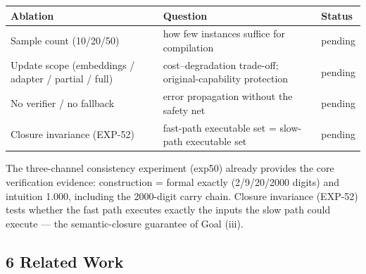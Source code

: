 \documentclass[
]{article}
\begin{document}
\begin{longtable}[]{@{}
  >{\raggedright\arraybackslash}p{}
  >{\raggedright\arraybackslash}p{}
  >{\raggedright\arraybackslash}p{}@{}}
\toprule\noalign{}
\begin{minipage}[b]{\linewidth}\raggedright
Ablation
\end{minipage} & \begin{minipage}[b]{\linewidth}\raggedright
Question
\end{minipage} & \begin{minipage}[b]{\linewidth}\raggedright
Status
\end{minipage} \\
\midrule\noalign{}
\endhead
\bottomrule\noalign{}
\endlastfoot
Sample count (10/20/50) & how few instances suffice for compilation &
pending \\
Update scope (embeddings / adapter / partial / full) & cost--degradation
trade-off; original-capability protection & pending \\
No verifier / no fallback & error propagation without the safety net &
pending \\
Closure invariance (EXP-52) & fast-path executable set = slow-path
executable set & pending \\
\end{longtable}

The three-channel consistency experiment (exp50) already provides the
core verification evidence: construction = formal exactly (2/9/20/2000
digits) and intuition 1.000, including the 2000-digit carry chain.
Closure invariance (EXP-52) tests whether the fast path executes exactly
the inputs the slow path could execute --- the semantic-closure
guarantee of Goal (iii).

\subsection{6 Related Work}\label{related-work}
\end{document}
